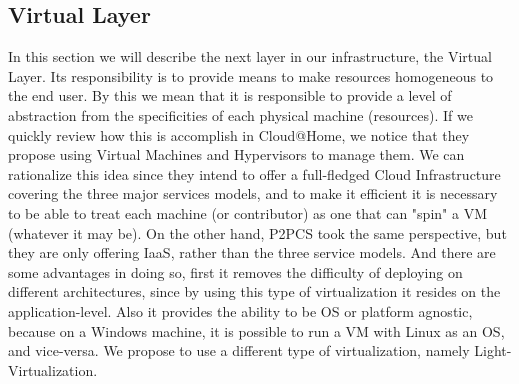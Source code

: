 \documentclass[11pt]{amsart}
\begin{document}
\begin{enumarate}
        \section{Virtual Layer}
        In this section we will describe the next layer in our infrastructure, the Virtual
        Layer. Its responsibility is to provide means to make resources homogeneous to the
        end user. By this we mean that it is responsible to provide a level of abstraction
        from the specificities of each physical machine (resources). If we quickly review
        how this is accomplish in Cloud@Home, we notice that they propose using Virtual
        Machines and Hypervisors to manage them. We can rationalize this idea since they
        intend to offer a full-fledged Cloud Infrastructure covering the three major
        services models, and to make it efficient it is necessary to be able to treat each
        machine (or contributor) as one that can "spin" a VM (whatever it may be). On the
        other hand, P2PCS took the same perspective, but they are only offering IaaS,
        rather than the three service models. And there are some advantages in doing so,
        first it removes the difficulty of deploying on different architectures, since by
        using this type of virtualization it resides on the application-level. Also it
        provides the ability to be OS or platform agnostic, because on a Windows machine,
        it is possible to run a VM with Linux as an OS, and vice-versa. We propose to use
        a different type of virtualization, namely Light-Virtualization.
        

\end{enumarate}
\end{document}
